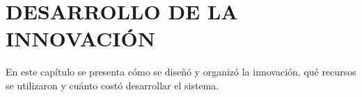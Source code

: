 \chapter{DESARROLLO DE LA INNOVACIÓN}
\label{chap:desarrollo_innovacion}

En este capítulo se presenta cómo se diseñó y organizó la innovación, qué recursos se utilizaron y cuánto costó desarrollar el sistema.





